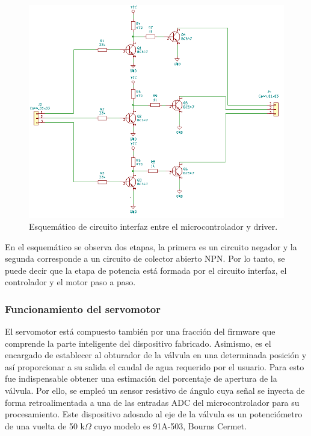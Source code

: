\begin{figure} [htpb]
\centering
\includegraphics[scale=.85]{./Figures/esquematico-circuito-interfaz.png}
\caption{Esquemático de circuito interfaz entre el microcontrolador y driver.}
\label{fig:esquemático circuito interfaz}
\end{figure}

En el esquemático se observa dos etapas, la primera es un circuito negador y la segunda corresponde a un circuito de colector abierto NPN.
Por lo tanto, se puede decir que la etapa de potencia está formada por el circuito interfaz, el controlador y el motor paso a paso. 

\vspace{3cm}

\subsubsection{Funcionamiento del servomotor}
 
El servomotor está compuesto también por una fracción del firmware que comprende la parte inteligente del dispositivo fabricado.
Asimismo, es el encargado de establecer al obturador de la válvula en una determinada posición y así proporcionar a su salida el caudal de agua requerido por el usuario. 
Para esto fue indispensable obtener una estimación del porcentaje de apertura de la válvula. Por ello, se empleó un sensor resistivo de ángulo cuya señal se inyecta de forma retroalimentada a una de las entradas ADC del microcontrolador para su procesamiento. Este dispositivo adosado al eje de la válvula es un potenciómetro de una vuelta de 50 k$\Omega$ cuyo modelo es 91A-503, Bourns Cermet.

